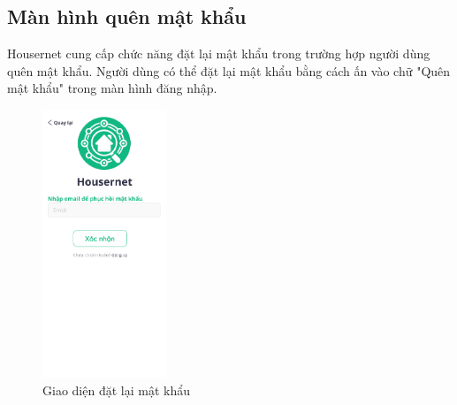 \subsection{Màn hình quên mật khẩu}
Housernet cung cấp chức năng đặt lại mật khẩu trong trường hợp người dùng quên mật khẩu. Người dùng có thể đặt lại mật khẩu bằng cách ấn vào chữ "Quên mật khẩu" trong màn hình đăng nhập.
\begin{figure}[H]
    \centering
    \includegraphics[width=0.33\textwidth]{Images/UI figma/Reset Password.png}
    \caption{Giao diện đặt lại mật khẩu}
\end{figure}
\newpage
